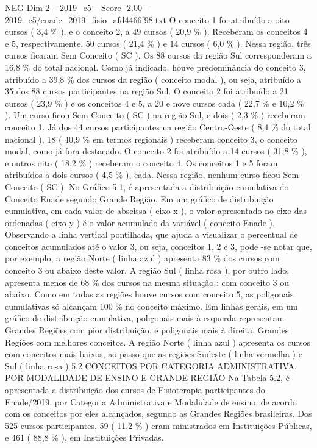 \begin{textsample}{NEG Dim 2 – 2019\_c5 – Score -2.00 – 2019\_c5/enade\_2019\_fisio\_afd4466f98.txt}
O conceito 1 foi atribuído a oito cursos ( 3,4 \% ), e o conceito 2, a 49 cursos ( 20,9 \% ).
Receberam os conceitos 4 e 5, respectivamente, 50 cursos ( 21,4 \% ) e 14 cursos ( 6,0 \% ).
Nessa região, três cursos ficaram Sem Conceito ( SC ).
Os 88 cursos da região Sul corresponderam a 16,8 \% do total nacional.
Como já indicado, houve predominância do conceito 3, atribuído a 39,8 \% dos cursos da região ( conceito modal ), ou seja, atribuído a 35 dos 88 cursos participantes na região Sul.
O conceito 2 foi atribuído a 21 cursos ( 23,9 \% ) e os conceitos 4 e 5, a 20 e nove cursos cada ( 22,7 \% e 10,2 \% ).
Um curso ficou Sem Conceito ( SC ) na região Sul, e dois ( 2,3 \% ) receberam conceito 1.
Já dos 44 cursos participantes na região Centro-Oeste ( 8,4 \% do total nacional ), 18 ( 40,9 \% em termos regionais ) receberam conceito 3, o conceito modal, como já fora destacado.
O conceito 2 foi atribuído a 14 cursos ( 31,8 \% ), e outros oito ( 18,2 \% ) receberam o conceito 4.
Os conceitos 1 e 5 foram atribuídos a dois cursos ( 4,5 \% ), cada.
Nessa região, nenhum curso ficou Sem Conceito ( SC ).
No Gráfico 5.1, é apresentada a distribuição cumulativa do Conceito Enade segundo Grande Região.
Em um gráfico de distribuição cumulativa, em cada valor de abscissa ( eixo x ), o valor apresentado no eixo das ordenadas ( eixo y ) é o valor acumulado da variável ( conceito Enade ).
Observando a linha vertical pontilhada, que ajuda a visualizar o percentual de conceitos acumulados até o valor 3, ou seja, conceitos 1, 2 e 3, pode -se notar que, por exemplo, a região Norte ( linha azul ) apresenta 83 \% dos cursos com conceito 3 ou abaixo deste valor.
A região Sul ( linha rosa ), por outro lado, apresenta menos de 68 \% dos cursos na mesma situação : com conceito 3 ou abaixo.
Como em todas as regiões houve cursos com conceito 5, as poligonais cumulativas só alcançam 100 \% no conceito máximo.
Em linhas gerais, em um gráfico de distribuição cumulativa, poligonais mais à esquerda representam Grandes Regiões com pior distribuição, e poligonais mais à direita, Grandes Regiões com melhores conceitos.
A região Norte ( linha azul ) apresenta os cursos com conceitos mais baixos, ao passo que as regiões Sudeste ( linha vermelha ) e Sul ( linha rosa ) 5.2 CONCEITOS POR CATEGORIA ADMINISTRATIVA, POR MODALIDADE DE ENSINO E GRANDE REGIÃO Na Tabela 5.2, é apresentada a distribuição dos cursos de Fisioterapia participantes do Enade/2019, por Categoria Administrativa e Modalidade de ensino, de acordo com os conceitos por eles alcançados, segundo as Grandes Regiões brasileiras.
Dos 525 cursos participantes, 59 ( 11,2 \% ) eram ministrados em Instituições Públicas, e 461 ( 88,8 \% ), em Instituições Privadas.

\end{textsample}
